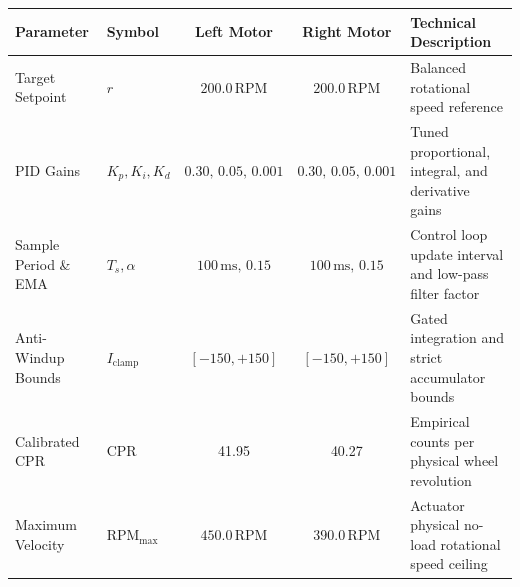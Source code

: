 \documentclass[11pt,a4paper]{article}
\begin{document}
\vspace{0.08cm}
\noindent
\begin{minipage}{\textwidth}
\centering
\scriptsize
\renewcommand{\arraystretch}{0.70}
\begin{tabularx}{\textwidth}{@{}llccX@{}}
\toprule
\textbf{Parameter} & \textbf{Symbol} & \textbf{Left Motor} & \textbf{Right Motor} & \textbf{Technical Description} \\
\midrule
Target Setpoint & $r$ & $200.0\,\text{RPM}$ & $200.0\,\text{RPM}$ & Balanced rotational speed reference \\
PID Gains & $K_p, K_i, K_d$ & $0.30,\, 0.05,\, 0.001$ & $0.30,\, 0.05,\, 0.001$ & Tuned proportional, integral, and derivative gains \\
Sample Period \& EMA & $T_s, \alpha$ & $100\,\text{ms},\, 0.15$ & $100\,\text{ms},\, 0.15$ & Control loop update interval and low-pass filter factor \\
Anti-Windup Bounds & $I_{\text{clamp}}$ & $[-150, +150]$ & $[-150, +150]$ & Gated integration and strict accumulator bounds \\
Calibrated CPR & $\text{CPR}$ & 41.95 & 40.27 & Empirical counts per physical wheel revolution \\
Maximum Velocity & $\text{RPM}_{\max}$ & $450.0\,\text{RPM}$ & $390.0\,\text{RPM}$ & Actuator physical no-load rotational speed ceiling \\
\bottomrule
\end{tabularx}
\label{tab_params}
\end{minipage}
\end{document}
